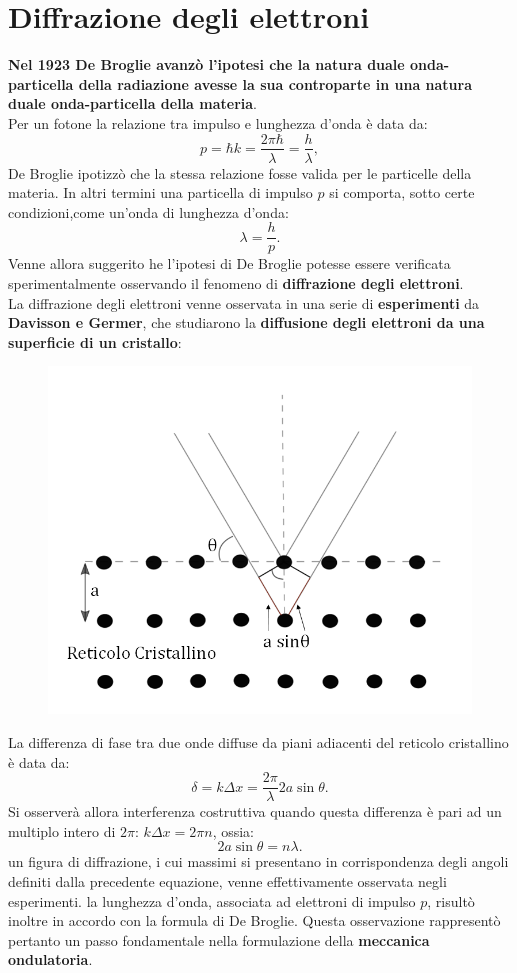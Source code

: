 \section{Diffrazione degli elettroni}
\textbf{Nel 1923 De Broglie avanzò l'ipotesi che la natura duale onda-particella della radiazione avesse la sua controparte in una natura duale onda-particella della materia}.\\
Per un fotone la relazione tra impulso e lunghezza d'onda è data da:
\begin{equation}
p= \hbar k = \frac{2\pi \hbar}{\lambda}=\frac{h}{\lambda},
\end{equation}
De Broglie ipotizzò che la stessa relazione fosse valida per le particelle della materia. In altri termini una particella di impulso $p$ si comporta, sotto certe condizioni,come un'onda di lunghezza d'onda:
\begin{equation}
\lambda=\frac{h}{p}.
\end{equation}
Venne allora suggerito he l'ipotesi di De Broglie potesse essere verificata sperimentalmente osservando il fenomeno di \textbf{diffrazione degli elettroni}.\\
La diffrazione degli elettroni venne osservata in una serie di \textbf{esperimenti} da \textbf{Davisson e Germer}, che studiarono la \textbf{diffusione degli elettroni da una superficie di un cristallo}:
\newpage
\begin{figure}[!htbp]
\begin{center}
\includegraphics[width=.65\textwidth]{immagini/cap_1/fig_1_5.png}
\end{center}
\end{figure}
La differenza di fase tra due onde diffuse  da piani adiacenti del reticolo cristallino è data da:
\begin{equation}
\delta = k \Delta x = \frac{2 \pi}{\lambda} 2a \sin \theta.
\end{equation}
Si osserverà allora interferenza costruttiva quando questa differenza è pari ad un multiplo intero di $2 \pi$: $k \Delta x = 2 \pi n$, ossia:
\begin{equation}
2a \sin \theta = n\lambda.
\end{equation}
un figura di diffrazione, i cui massimi si presentano in corrispondenza degli angoli definiti dalla precedente equazione, venne effettivamente osservata negli esperimenti. la lunghezza d'onda, associata ad elettroni di impulso $p$, risultò inoltre in accordo con la formula di De Broglie. Questa osservazione rappresentò pertanto un passo fondamentale nella formulazione della \textbf{meccanica ondulatoria}.
